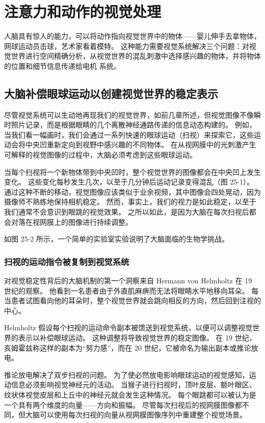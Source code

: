 \chapter{注意力和动作的视觉处理} \label{chap:chap25}
人脑具有惊人的能力，可以将动作指向视觉世界中的物体——婴儿伸手去拿物体，网球运动员击球，艺术家看着模特。 这种能力需要视觉系统解决三个问题：对视觉世界进行空间精确分析，从视觉世界的混乱刺激中选择感兴趣的物体，并将物体的位置和细节信息传递给电机 系统。

\section{大脑补偿眼球运动以创建视觉世界的稳定表示}
尽管视觉系统可以生动地再现我们的视觉世界，如前几章所述，但视觉图像不像瞬时照片记录，而是根据眼睛的几个离散神经通路传递的信息动态构建的。 例如，当我们看一幅画时，我们会通过一系列快速的眼球运动（扫视）来探索它，这些运动会将中央凹重新定向到视野中感兴趣的不同物体。 在从视网膜中的光刺激产生可解释的视觉图像的过程中，大脑必须考虑到这些眼球运动。

当每个扫视将一个新物体带到中央凹时，整个视觉世界的图像都会在中央凹上发生变化。 这些变化每秒发生几次，以至于几分钟后运动记录变得混乱（图 25-1）。 通过这种不断的移动，视觉图像应该类似于业余视频，其中图像会四处晃动，因为摄像师不熟练地保持相机稳定。 然而，事实上，我们的视力是如此稳定，以至于我们通常不会意识到眼跳的视觉效果。 之所以如此，是因为大脑在每次扫视后都会对落在视网膜上的图像进行持续调整。

如图 25-2 所示，一个简单的实验室实验说明了大脑面临的生物学挑战。

\subsection{扫视的运动指令被复制到视觉系统}

对视觉稳定性背后的大脑机制的第一个洞察来自 Hermann von Helmholtz 在 19 世纪的观察。 他看到一名患者由于外直肌麻痹而无法将眼睛水平地移向耳朵。 每当患者试图看向他的耳朵时，整个视觉世界就会跳向相反的方向，然后回到注视的中心。

Helmholtz 假设每个扫视的运动命令副本被馈送到视觉系统，以便可以调整视觉世界的表示以补偿眼球运动。 这种调整将导致视觉世界的稳定图像。 在 19 世纪，亥姆霍兹称这样的副本为“努力感”，而在 20 世纪，它被命名为输出副本或推论放电。

推论放电解决了双步扫视的问题。 为了使必然放电影响眼球运动的视觉感知，运动信息必须影响视觉神经元的活动。 当猴子进行扫视时，顶叶皮层、额叶眼区、纹状体视觉皮层和上丘中的神经元就会发生这种情况。 每个眼跳都可以被认为是一个具有两个维度的向量——方向和振幅。 尽管每次扫视后的视网膜图像都不同，但大脑可以使用每次扫视的向量从视网膜图像序列中重建整个视觉场景。

